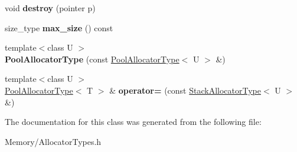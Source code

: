 \begin{DoxyCompactItemize}
void {\bfseries destroy} (pointer p)
\item 
\mbox{\label{classCantMemory_1_1PoolAllocatorType_a387d605927d35a2b57b4d3c889b20ccb}} 
size\+\_\+type {\bfseries max\+\_\+size} () const
\item 
\mbox{\label{classCantMemory_1_1PoolAllocatorType_ac9d76c2707d174d6d567a66043214b76}} 
{\footnotesize template$<$class U $>$ }\\{\bfseries Pool\+Allocator\+Type} (const \hyperlink{classCantMemory_1_1PoolAllocatorType}{Pool\+Allocator\+Type}$<$ U $>$ \&)
\item 
\mbox{\label{classCantMemory_1_1PoolAllocatorType_a753332db4fd0323f53f8cebf9d113ca9}} 
{\footnotesize template$<$class U $>$ }\\\hyperlink{classCantMemory_1_1PoolAllocatorType}{Pool\+Allocator\+Type}$<$ T $>$ \& {\bfseries operator=} (const \hyperlink{classCantMemory_1_1StackAllocatorType}{Stack\+Allocator\+Type}$<$ U $>$ \&)
\end{DoxyCompactItemize}


The documentation for this class was generated from the following file\+:\begin{DoxyCompactItemize}
\item 
Memory/Allocator\+Types.\+h\end{DoxyCompactItemize}
